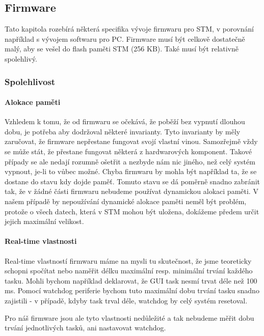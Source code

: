 
\subsection{Firmware}

Tato kapitola rozebírá některá specifika vývoje firmwaru pro STM, v porovnání například s vývojem
softwaru pro PC.
Firmware musí být celkově dostatečně malý, aby se vešel do flash paměti STM (256 KB).
Také musí být relativně spolehlivý.

\subsubsection{Spolehlivost}

\paragraph{Alokace paměti}
Vzhledem k tomu, že od firmwaru se očekává, že poběží bez vypnutí dlouhou dobu, je potřeba aby
dodržoval některé invarianty.
Tyto invarianty by měly zaručovat, že firmware nepřestane fungovat svojí vlastní vinou.
Samozřejmě vždy se může stát, že přestane fungovat některá z hardwarových komponent.
Takové případy se ale nedají rozumně ošetřit a nezbyde nám nic jiného, než celý systém vypnout,
je-li to vůbec možné.
Chyba firmwaru by mohla být například ta, že se dostane do stavu kdy dojde paměť.
Tomuto stavu se dá poměrně snadno zabránit tak, že v žádné části firmwaru nebudeme používat
dynamickou alokaci paměti.
V našem případě by nepoužívání dynamické alokace paměti neměl být problém, protože o všech datech,
která v STM mohou být uložena, dokážeme předem určit jejich maximální velikost.

\paragraph{Real-time vlastnosti}
Real-time vlastností firmwaru máme na mysli tu skutečnost, že jsme teoreticky schopni spočítat nebo
naměřit délku maximální resp. minimální trvání každého tasku.
Mohli bychom například deklarovat, že GUI task nesmí trvat déle než
100 ms.
Pomocí watchdog periferie \cite{ReferenceManual} bychom tuto maximální dobu trvání tasku snadno zajistili - v
případě, kdyby task trval déle, watchdog by celý systém resetoval.

Pro náš firmware jsou ale tyto vlastnosti nedůležité a tak nebudeme měřit dobu trvání jednotlivých
tasků, ani nastavovat watchdog.


